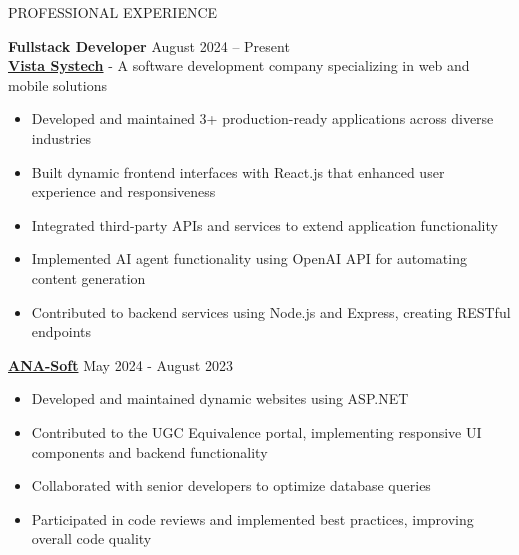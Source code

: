 \documentclass{resume} %
\begin{document}
\begin{rSection}{PROFESSIONAL EXPERIENCE}

\textbf{Fullstack Developer} \hfill August 2024 – Present\\
\textbf{\href{https://vistasystech.com/}{Vista Systech}} - A software development company specializing in web and mobile solutions

\begin{itemize}
    \itemsep -3pt {}
    \item Developed and maintained 3+ production-ready applications across diverse industries
    \item Built dynamic frontend interfaces with React.js that enhanced user experience and responsiveness
    \item Integrated third-party APIs and services to extend application functionality
    \item Implemented AI agent functionality using OpenAI API for automating content generation
    \item Contributed to backend services using Node.js and Express, creating RESTful endpoints
\end{itemize}

\textbf{\href{https://ana-soft.com/}{ANA-Soft}} \hfill May 2024 - August 2023\\
 

\begin{itemize}
    \itemsep -3pt {}
    \item Developed and maintained dynamic websites using ASP.NET
    \item Contributed to the UGC Equivalence portal, implementing responsive UI components and backend functionality
    \item Collaborated with senior developers to optimize database queries
    \item Participated in code reviews and implemented best practices, improving overall code quality
\end{itemize}

\end{rSection} 

\end{document}
